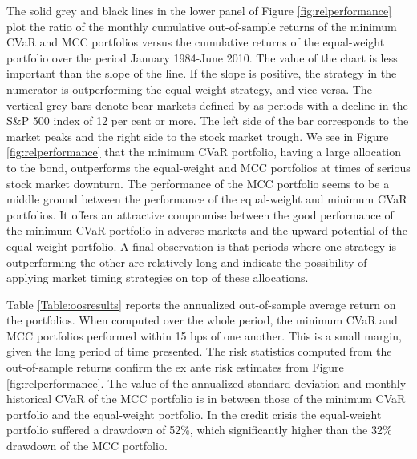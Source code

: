 \documentclass[12pt,a4paper]{article}
\begin{document}
The solid grey and black lines in the lower panel of Figure \ref{fig:relperformance} plot the ratio of the monthly cumulative out-of-sample returns of the minimum CVaR and MCC portfolios versus the cumulative returns of the equal-weight portfolio over the period January 1984-June 2010. The value of the chart is less important than the slope of the line. If the slope is positive, the strategy in the numerator is outperforming the equal-weight strategy, and vice versa. The vertical grey bars denote bear markets defined by \citet{Ellis2005} as periods with a decline in the S\&P 500 index of 12 per cent or more. The left side of the bar corresponds to the market peaks and the right side to the stock market trough.  We see in Figure \ref{fig:relperformance} that the minimum CVaR portfolio, having a large allocation to the bond, outperforms the equal-weight and MCC portfolios at times of serious stock market downturn. The performance of the MCC portfolio seems to be a middle ground between the performance of the equal-weight and minimum CVaR portfolios. It offers an attractive compromise between the good performance of the minimum CVaR portfolio in adverse markets and the upward potential of the equal-weight portfolio. A final observation is that periods where one strategy is outperforming the other are relatively long and indicate the possibility of applying market timing strategies on top of these allocations.

Table \ref{Table:oosresults} reports the annualized out-of-sample average return on the portfolios. When computed over the whole period, the minimum CVaR and MCC portfolios performed within 15 bps of one another. This is a small margin, given the long period of time presented. The risk statistics computed from the out-of-sample returns confirm the ex ante risk estimates from Figure \ref{fig:relperformance}.  The value of the annualized standard deviation and monthly historical CVaR of the MCC portfolio is in between those of the minimum CVaR portfolio and the equal-weight portfolio.    In the credit crisis the equal-weight portfolio suffered a drawdown of 52\%, which significantly higher than the 32\%  drawdown of the MCC portfolio.
\end{document}
